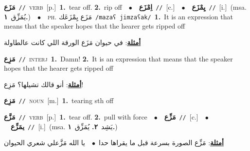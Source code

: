 \documentclass[10pt,a4paper,twoside]{article} %
\begin{document}
\begin{multicols}{2}
{\setlength\topsep{0pt}\textbf{\foreignlanguage{arabic}{مَزَع}}\ {\color{gray}\texttt{//}\color{black}}\ \textsc{verb}\ [p.]\ \textbf{1.}~tear off.  \textbf{2.}~rip off\ \ $\bullet$\ \ \setlength\topsep{0pt}\textbf{\foreignlanguage{arabic}{اِمْزَع}}\ {\color{gray}\texttt{//}\color{black}}\ [c.]\ \ $\bullet$\ \ \setlength\topsep{0pt}\textbf{\foreignlanguage{arabic}{يِمْزَع}}\ {\color{gray}\texttt{//}\color{black}}\ [i.]\ \color{gray}(msa. \foreignlanguage{arabic}{يُمَزِّق}~\foreignlanguage{arabic}{\textbf{١.}})\color{black}\ \ $\bullet$\ \ \textsc{ph.} \color{gray} \foreignlanguage{arabic}{مَزَع يِمْزَعَك}\color{black}\ {\color{gray}\texttt{/{\sffamily mazaʕ jimzaʕak}/}\color{black}}\ \textbf{1.}~It is an expression that means that the speaker hopes that the hearer gets ripped off\  \begin{flushright}\color{gray}\foreignlanguage{arabic}{\textbf{\underline{\foreignlanguage{arabic}{أمثلة}}}: في حيوان مَزَع الورقة اللي كانت عالطاولة}\end{flushright}\color{black}} \vspace{2mm}

{\setlength\topsep{0pt}\textbf{\foreignlanguage{arabic}{مَزِع}}\ {\color{gray}\texttt{//}\color{black}}\ \textsc{interj}\ \textbf{1.}~Damn!  \textbf{2.}~It is an expression that means that the speaker hopes that the hearer gets ripped off\  \begin{flushright}\color{gray}\foreignlanguage{arabic}{\textbf{\underline{\foreignlanguage{arabic}{أمثلة}}}: أنو قالك تشيلها؟ مَزِع!}\end{flushright}\color{black}} \vspace{2mm}

{\setlength\topsep{0pt}\textbf{\foreignlanguage{arabic}{مَزِع}}\ {\color{gray}\texttt{//}\color{black}}\ \textsc{noun}\ [m.]\ \textbf{1.}~tearing sth off\ } \vspace{2mm}

{\setlength\topsep{0pt}\textbf{\foreignlanguage{arabic}{مَزَّع}}\ {\color{gray}\texttt{//}\color{black}}\ \textsc{verb}\ [p.]\ \textbf{1.}~tear off.  \textbf{2.}~pull with force\ \ $\bullet$\ \ \setlength\topsep{0pt}\textbf{\foreignlanguage{arabic}{مَزِّع}}\ {\color{gray}\texttt{//}\color{black}}\ [c.]\ \ $\bullet$\ \ \setlength\topsep{0pt}\textbf{\foreignlanguage{arabic}{يمَزِّع}}\ {\color{gray}\texttt{//}\color{black}}\ [i.]\ \color{gray}(msa. \foreignlanguage{arabic}{يَشِد}~\foreignlanguage{arabic}{\textbf{٢.}}  \foreignlanguage{arabic}{يُمَزِّق}~\foreignlanguage{arabic}{\textbf{١.}})\color{black}\  \begin{flushright}\color{gray}\foreignlanguage{arabic}{\textbf{\underline{\foreignlanguage{arabic}{أمثلة}}}: مَزِّع الصورة بسرعة قبل ما يقراها حدا\ $\bullet$\ \  يا الله مَزَّعلي شعري الحيوان}\end{flushright}\color{black}} \vspace{2mm}


\end{multicols}
\end{document}
